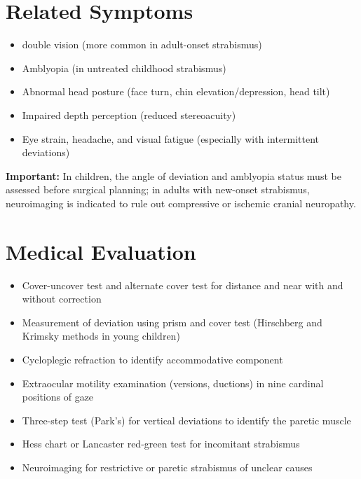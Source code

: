 \section*{Related Symptoms}
\begin{itemize}
  \item double vision (more common in adult-onset strabismus)
  \item Amblyopia (in untreated childhood strabismus)
  \item Abnormal head posture (face turn, chin elevation/depression, head tilt)
  \item Impaired depth perception (reduced stereoacuity)
  \item Eye strain, headache, and visual fatigue (especially with intermittent deviations)
\end{itemize}
\textbf{Important:} In children, the angle of deviation and amblyopia status must be assessed before surgical planning; in adults with new-onset strabismus, neuroimaging is indicated to rule out compressive or ischemic cranial neuropathy.

\section*{Medical Evaluation}
\begin{itemize}
  \item Cover-uncover test and alternate cover test for distance and near with and without correction
  \item Measurement of deviation using prism and cover test (Hirschberg and Krimsky methods in young children)
  \item Cycloplegic refraction to identify accommodative component
  \item Extraocular motility examination (versions, ductions) in nine cardinal positions of gaze
  \item Three-step test (Park's) for vertical deviations to identify the paretic muscle
  \item Hess chart or Lancaster red-green test for incomitant strabismus
  \item Neuroimaging for restrictive or paretic strabismus of unclear causes
\end{itemize}

